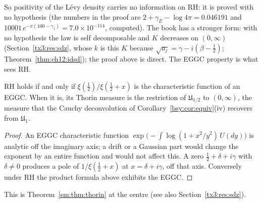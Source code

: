 So positivity of the L\'evy density carries no information on RH: it is proved with no hypothesis (the numbers in the proof are $2+\gamma_E-\log4\pi=0.046191$ and $10001\,e^{-\pi(100-\gamma_1)}=7.0\times10^{-114}$, computed). The book has a stronger form: with no hypothesis the law is self decomposable and $K$ decreases on $(0,\infty)$ (Section~\ref{tx3:res:sdz}, whose $k$ is this $K$ because $\sqrt{a_j}=\gamma-i(\beta-\frac12)$; Theorem~\ref{thm:ch12:idsd}); the proof above is direct. The EGGC property is what sees RH.

\begin{proposition}\label{bsy:prop:eggc}
RH holds if and only if $\xi(\frac12)/\xi(\frac12+x)$ is the characteristic function of an EGGC. When it is, its Thorin measure is the restriction of $\mathfrak U_{1/2}$ to $(0,\infty)$, the measure that the Cauchy deconvolution of Corollary~\ref{bsy:cor:equiv}(iv) recovers from $\mathfrak U_1$.
\end{proposition}

\begin{proof}
An EGGC characteristic function $\exp\bigl(-\int\log(1+x^2/y^2)\,U(dy)\bigr)$ is analytic off the imaginary axis; a drift or a Gaussian part would change the exponent by an entire function and would not affect this. A zero $\frac12+\delta+i\gamma$ with $\delta\ne0$ produces a pole of $1/\xi(\frac12+x)$ at $x=\delta+i\gamma$, off that axis. Conversely under RH the product formula above exhibits the EGGC.
\end{proof}

\noindent This is Theorem~\ref{sm:thm:thorin} at the centre (see also Section~\ref{tx3:res:sdz}).

